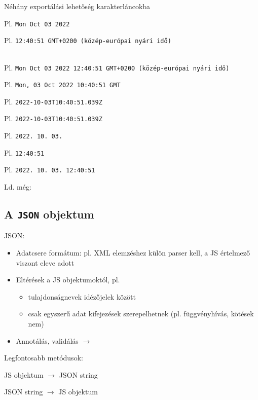 \begin{frame}
  Néhány exportálási lehetőség karakterláncokba
  \begin{description}[]
    \item[\texttt{toDateString()}] Pl. \texttt{Mon Oct 03 2022}
    \item[\texttt{toTimeString()}] Pl. \texttt{12:40:51 GMT+0200 (közép-európai nyári idő)}
    \item[\texttt{toString()}] \hfill \\ Pl. \texttt{Mon Oct 03 2022 12:40:51 GMT+0200 (közép-európai nyári idő)}
    \item[\texttt{toUTCString()}] Pl. \texttt{Mon, 03 Oct 2022 10:40:51 GMT}
    \item[\texttt{toISOString()}] Pl. \texttt{2022-10-03T10:40:51.039Z}
    \item[\texttt{toJSON()}] Pl. \texttt{2022-10-03T10:40:51.039Z}
    \item[\texttt{toLocaleDateString()}] Pl. \texttt{2022. 10. 03.}
    \item[\texttt{toLocaleTimeString()}] Pl. \texttt{12:40:51}
    \item[\texttt{toLocaleString()}] Pl. \texttt{2022. 10. 03. 12:40:51}
  \end{description}
  Ld. még: 
\end{frame}

\subsection{A \texttt{JSON} objektum}

\begin{frame}
  JSON: 
  \begin{itemize}
    \item Adatcsere formátum: pl. XML elemzéshez külön parser kell, a JS értelmező viszont eleve adott
    \item Eltérések a JS objektumoktól, pl.
    \begin{itemize}
      \item tulajdonságnevek idézőjelek között
      \item csak egyszerű adat kifejezések szerepelhetnek (pl. függvényhívás, kötések nem)
    \end{itemize}
    \item Annotálás, validálás $\to$ 
  \end{itemize}
  Legfontosabb metódusok:
  \begin{description}[m]
    \item[\texttt{stringify()}] JS objektum $\to$ JSON string 
    \item[\texttt{parse()}] JSON string $\to$ JS objektum
  \end{description}
\end{frame}

